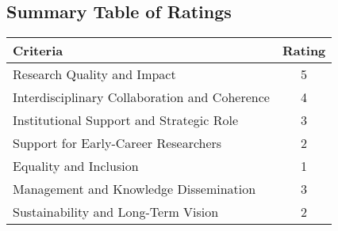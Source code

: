 \documentclass{article}
\begin{document}
\subsection{Summary Table of Ratings}

\begin{center}
\begin{tabular}{|l|c|}
\hline
\textbf{Criteria} & \textbf{Rating} \\
\hline
Research Quality and Impact & 5 \\
Interdisciplinary Collaboration and Coherence & 4 \\
Institutional Support and Strategic Role & 3 \\
Support for Early-Career Researchers & 2 \\
Equality and Inclusion & 1 \\
Management and Knowledge Dissemination & 3 \\
Sustainability and Long-Term Vision & 2 \\
\hline
\end{tabular}
\end{center}
\end{document}
